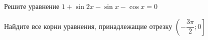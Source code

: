 \begin{ex}
	\begin{condition}
		\begin{enumcols}[label=\asbuk*)]
			\item Решите уравнение \( 1 + \sin 2x -\sin x -\cos x = 0 \)
			\item Найдите все корни уравнения, принадлежащие отрезку \( \left(-\dfrac{3\pi}{2};0\right] \)
		\end{enumcols}
	\end{condition}
\end{ex}